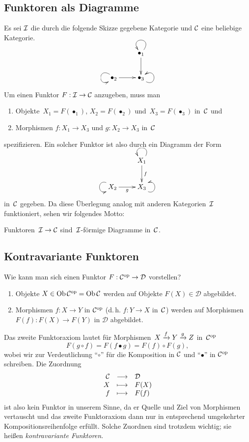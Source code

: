 \subsection{Funktoren als Diagramme}

Es sei $\mathcal{I}$ die durch die folgende Skizze gegebene Kategorie und $\mathcal{C}$ eine beliebige Kategorie.

\[ \xymatrix{
  & \bullet_1 \ar[d] \ar@(ur,ul) \\
  \bullet_2 \ar[r] \ar@(ul,dl) & \bullet_3 \ar@(dr,ur)
} \]

Um einen Funktor $F : \mathcal{I} \to \mathcal{C}$ anzugeben, muss man
\begin{enumerate}
  \item Objekte~$X_1 = F(\bullet_1)$, $X_2 = F(\bullet_2)$ und~$X_3 =
  F(\bullet_3)$ in~$\mathcal{C}$ und
  \item Morphismen $f:X_1 \to X_3$ und $g:X_2 \to X_3$ in~$\mathcal{C}$
\end{enumerate}
spezifizieren. Ein solcher Funktor ist also durch ein Diagramm der Form

\[ \xymatrix{
  & X_1 \ar[d]^f \ar@(ur,ul) \\
  X_2 \ar[r]_g \ar@(ul,dl) & X_3 \ar@(dr,ur)
} \]
in~$\mathcal{C}$ gegeben. Da diese Überlegung analog mit anderen Kategorien~$\mathcal{I}$
funktioniert, sehen wir folgendes Motto:
\begin{motto}Funktoren~$\mathcal{I} \to \mathcal{C}$ sind~$\mathcal{I}$-förmige Diagramme
in~$\mathcal{C}$.\end{motto}



\subsection{Kontravariante Funktoren}

Wie kann man sich einen Funktor $F : \mathcal{C}^{\mathrm{op}} \to \mathcal{D}$ vorstellen?
\begin{enumerate}
  \item Objekte $X \in \operatorname{Ob} \mathcal{C}^{\mathrm{op}} = \operatorname{Ob} \mathcal{C}$ werden auf Objekte $F(X) \in \mathcal{D}$
  abgebildet.
  \item Morphismen $f : X \to Y$ in $\mathcal{C}^{\mathrm{op}}$ (d.\,h. $f : Y \to X$ in~$\mathcal{C}$)
  werden auf Morphismen $F(f) : F(X) \to F(Y)$ in $\mathcal{D}$ abgebildet.
\end{enumerate}
Das zweite Funktoraxiom lautet für Morphismen~$X \xrightarrow{f} Y \xrightarrow{g} Z$
in~$\mathcal{C}^{\mathrm{op}}$
\[ F(g \circ f) = F(f \bullet g) = F(f) \circ F(g), \] 
wobei wir zur Verdeutlichung "`$\circ$"' für die Komposition in $\mathcal{C}$ und
"`$\bullet$"' in $\mathcal{C}^{\mathrm{op}}$ schreiben. Die Zuordnung
\[ \begin{array}{@{}rcl@{}}
  \C &\longrightarrow& \D \\
  X  &\longmapsto& F(X) \\
  f  &\longmapsto& F(f)
\end{array} \]
ist also kein Funktor in unserem Sinne, da er Quelle und Ziel von Morphismen
vertauscht und das zweite Funktoraxiom dann nur in entsprechend umgekehrter
Kompositionsreihenfolge erfüllt. Solche Zuordnen sind trotzdem wichtig; sie
heißen \emph{kontravariante Funktoren}.


